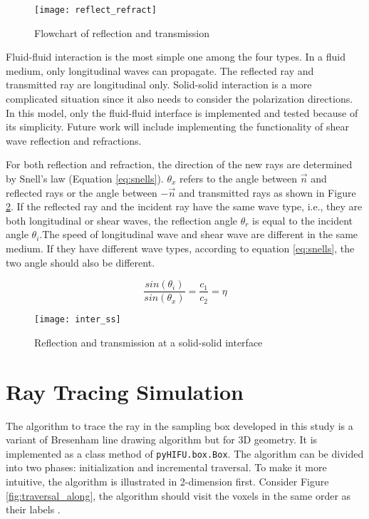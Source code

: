 \begin{figure}[h]
    \centering
    \texttt{[image: reflect\_refract]}
    \caption{Flowchart of reflection and transmission}
    \label{fig:reflect_refract}
\end{figure}

Fluid-fluid interaction is the most simple one among the four types. In a fluid medium, only longitudinal waves can propagate. The reflected ray and transmitted ray are longitudinal only. Solid-solid interaction is a more complicated situation since it also needs to consider the polarization directions. In this model, only the fluid-fluid interface is implemented and tested because of its simplicity. Future work will include implementing the functionality of shear wave reflection and refractions.

For both reflection and refraction, the direction of the new rays are determined by Snell's law (Equation \ref{eq:snells}). $\theta_x$ refers to the angle between $\vec{n}$ and reflected rays or the angle between $-\vec{n}$ and transmitted rays as shown in Figure \ref{fig:inter_ss}. If the reflected ray and the incident ray have the same wave type, i.e., they are both longitudinal or shear waves, the reflection angle $\theta_{r}$ is equal to the incident angle $\theta_i$.The speed of longitudinal wave and shear wave are different in the same medium. If they have different wave types, according to equation \ref{eq:snells}, the two angle should also be different.

\begin{equation} \label{eq:snells}
    \frac{sin(\theta_i)}{sin(\theta_{x})} = \frac{c_1}{c_2}=\eta
\end{equation}

\begin{figure}[h]
    \centering
    \texttt{[image: inter\_ss]}
    \caption{Reflection and transmission at a solid-solid interface}
    \label{fig:inter_ss}
\end{figure}

\section{Ray Tracing Simulation} \label{sec:ray_tracing}

The algorithm to trace the ray in the sampling box developed in this study is a variant of Bresenham line drawing algorithm \cite{bresenham} but for 3D geometry. It is implemented as a class method of \texttt{pyHIFU.box.Box}. The algorithm can be divided into two phases: initialization and incremental traversal. To make it more intuitive, the algorithm is illustrated in 2-dimension first. Consider Figure \ref{fig:traversal_along}, the algorithm should visit the voxels in the same order as their labels \cite{wooraytracing}.


